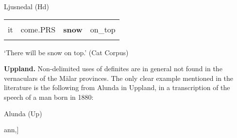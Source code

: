
\begin{listWWNumileveli}
\item 

\begin{styleExample}
Ljusnedal (Hd)

\end{styleExample}

\end{listWWNumileveli}

\begin{tabular}{llll}
\lsptoprule
\multicolumn{4}{l}{Dä

}\\
it & come.PRS & {\bfseries snow} & on\_top\\
\lspbottomrule
\end{tabular}

\begin{styleTranslation}
‘There will be snow on top.’ (Cat Corpus)

\end{styleTranslation}

\begin{styleBodytextC}
\textbf{Uppland. }Non-delimited uses of definites are in general not found in the vernaculars of the Mälar provinces. The only clear example mentioned in the literature is the following from Alunda in Uppland, in a transcription of the speech of a man born in 1880:

\end{styleBodytextC}

\begin{listWWNumileveli}
\item 

\begin{styleExample}
\label{bkm:Ref154222780}Alunda (Up)

\end{styleExample}

\end{listWWNumileveli}

\begin{styleExText}
[Ann(â)rs sô brênde-råm åpp rörn ib[29F?]ann,] 

\end{styleExText}

